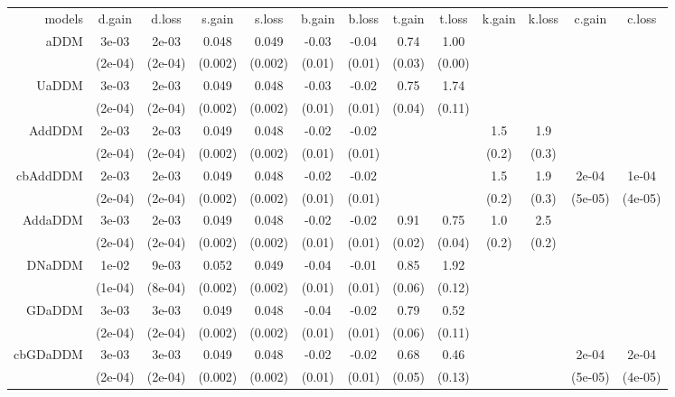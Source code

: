 \begin{table}[ht]
\centering
\begin{tabular}{|r|cc|cc|cc|cc|cc|cc|}
 models & d.gain & d.loss & s.gain & s.loss & b.gain & b.loss & t.gain & t.loss & k.gain & k.loss & c.gain & c.loss \\ 
 aDDM & 3e-03 & 2e-03 & 0.048 & 0.049 & -0.03 & -0.04 & 0.74 & 1.00 &  &  &  &  \\ 
   & (2e-04) & (2e-04) & (0.002) & (0.002) & (0.01) & (0.01) & (0.03) & (0.00) &  &  &  &  \\ 
   \hline
UaDDM & 3e-03 & 2e-03 & 0.049 & 0.048 & -0.03 & -0.02 & 0.75 & 1.74 &  &  &  &  \\ 
   & (2e-04) & (2e-04) & (0.002) & (0.002) & (0.01) & (0.01) & (0.04) & (0.11) &  &  &  &  \\ 
   \hline
AddDDM & 2e-03 & 2e-03 & 0.049 & 0.048 & -0.02 & -0.02 &  &  & 1.5 & 1.9 &  &  \\ 
   & (2e-04) & (2e-04) & (0.002) & (0.002) & (0.01) & (0.01) &  &  & (0.2) & (0.3) &  &  \\ 
   \hline
cbAddDDM & 2e-03 & 2e-03 & 0.049 & 0.048 & -0.02 & -0.02 &  &  & 1.5 & 1.9 & 2e-04 & 1e-04 \\ 
   & (2e-04) & (2e-04) & (0.002) & (0.002) & (0.01) & (0.01) &  &  & (0.2) & (0.3) & (5e-05) & (4e-05) \\ 
   \hline
AddaDDM & 3e-03 & 2e-03 & 0.049 & 0.048 & -0.02 & -0.02 & 0.91 & 0.75 & 1.0 & 2.5 &  &  \\ 
   & (2e-04) & (2e-04) & (0.002) & (0.002) & (0.01) & (0.01) & (0.02) & (0.04) & (0.2) & (0.2) &  &  \\ 
   \hline
DNaDDM & 1e-02 & 9e-03 & 0.052 & 0.049 & -0.04 & -0.01 & 0.85 & 1.92 &  &  &  &  \\ 
   & (1e-04) & (8e-04) & (0.002) & (0.002) & (0.01) & (0.01) & (0.06) & (0.12) &  &  &  &  \\ 
   \hline
GDaDDM & 3e-03 & 3e-03 & 0.049 & 0.048 & -0.04 & -0.02 & 0.79 & 0.52 &  &  &  &  \\ 
   & (2e-04) & (2e-04) & (0.002) & (0.002) & (0.01) & (0.01) & (0.06) & (0.11) &  &  &  &  \\ 
   \hline
cbGDaDDM & 3e-03 & 3e-03 & 0.049 & 0.048 & -0.02 & -0.02 & 0.68 & 0.46 &  &  & 2e-04 & 2e-04 \\ 
   & (2e-04) & (2e-04) & (0.002) & (0.002) & (0.01) & (0.01) & (0.05) & (0.13) &  &  & (5e-05) & (4e-05) \\ 

\end{tabular}
\end{table}
